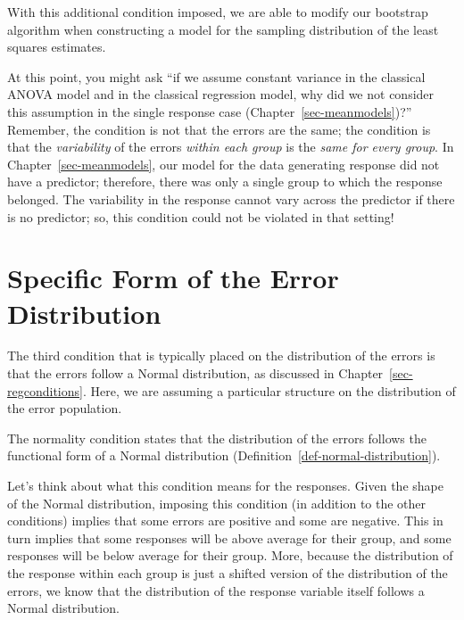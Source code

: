 \documentclass[
  letterpaper,
  DIV=11,
  numbers=noendperiod]{scrreprt}
\theoremstyle{plain}
\theoremstyle{definition}
\theoremstyle{definition}
\theoremstyle{remark}
\begin{document}
With this additional condition imposed, we are able to modify our
bootstrap algorithm when constructing a model for the sampling
distribution of the least squares estimates.

At this point, you might ask ``if we assume constant variance in the
classical ANOVA model and in the classical regression model, why did we
not consider this assumption in the single response case
(Chapter~\ref{sec-meanmodels})?'' Remember, the condition is not that
the errors are the same; the condition is that the \emph{variability} of
the errors \emph{within each group} is the \emph{same for every group}.
In Chapter~\ref{sec-meanmodels}, our model for the data generating
response did not have a predictor; therefore, there was only a single
group to which the response belonged. The variability in the response
cannot vary across the predictor if there is no predictor; so, this
condition could not be violated in that setting!

\section{Specific Form of the Error
Distribution}\label{specific-form-of-the-error-distribution-1}

The third condition that is typically placed on the distribution of the
errors is that the errors follow a Normal distribution, as discussed in
Chapter~\ref{sec-regconditions}. Here, we are assuming a particular
structure on the distribution of the error population.

\begin{tcolorbox}[enhanced jigsaw, breakable, titlerule=0mm, colframe=quarto-callout-note-color-frame, bottomtitle=1mm, opacityback=0, rightrule=.15mm, toptitle=1mm, arc=.35mm, bottomrule=.15mm, left=2mm, title=\textcolor{quarto-callout-note-color}{\faInfo}\hspace{0.5em}{Normality}, leftrule=.75mm, coltitle=black, toprule=.15mm, colbacktitle=quarto-callout-note-color!10!white, colback=white, opacitybacktitle=0.6]

The normality condition states that the distribution of the errors
follows the functional form of a Normal distribution
(Definition~\ref{def-normal-distribution}).

\end{tcolorbox}

Let's think about what this condition means for the responses. Given the
shape of the Normal distribution, imposing this condition (in addition
to the other conditions) implies that some errors are positive and some
are negative. This in turn implies that some responses will be above
average for their group, and some responses will be below average for
their group. More, because the distribution of the response within each
group is just a shifted version of the distribution of the errors, we
know that the distribution of the response variable itself follows a
Normal distribution.
\end{document}
